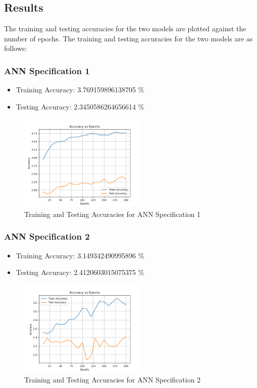 \documentclass[12pt]{article}
\begin{document}
\begin{enumerate}
\subsection{Results}
The training and testing accuracies for the two models are plotted against the number of epochs. The training and testing accuracies for the two models are as follows:
\subsubsection{ANN Specification 1}
\begin{itemize}
	\item Training Accuracy: 3.769159896138705 \%
	\item Testing Accuracy: 2.3450586264656614 \%
\end{itemize}
\begin{figure}[H]
	\centering
	\includegraphics[width=0.55\textwidth]{Model_improved_layer_32_101.png}
	\caption{Training and Testing Accuracies for ANN Specification 1}
	\label{fig:ann1}
\end{figure}
\subsubsection{ANN Specification 2}
\begin{itemize}
	\item Training Accuracy: 3.149342490995896 \%
	\item Testing Accuracy: 2.4120603015075375 \%
\end{itemize}
\begin{figure}[H]
	\centering
	\includegraphics[width=0.55\textwidth]{Model_improved_layer_64_32_101.png}
	\caption{Training and Testing Accuracies for ANN Specification 2}
	\label{fig:ann2}
\end{figure}

\end{enumerate}
\end{document}
